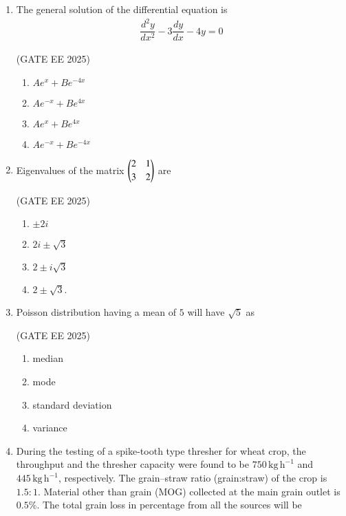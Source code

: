 \documentclass[journal,12pt,onecolumn]{IEEEtran}
\theoremstyle{remark}
\begin{document}
\begin{enumerate}
\item The general solution of the differential equation is
\begin{align*}
\dfrac{d^2 y}{dx^2} - 3\dfrac{dy}{dx} - 4y = 0
\end{align*}

\hfill(GATE EE 2025)

\begin{multicols}{4}
\begin{enumerate}
  \item  $Ae^{x} + Be^{-4x}$
  \item $Ae^{-x} + Be^{4x}$ 
  \item $Ae^{x} + Be^{4x}$ 
  \item $Ae^{-x} + Be^{-4x}$
\end{enumerate}
\end{multicols}

\item Eigenvalues of the matrix $\begin{pmatrix}2 & 1\\[2pt] 3 & 2\end{pmatrix}$ are\

\hfill(GATE EE 2025)

\begin{multicols}{4}
 \begin{enumerate}
     \item  $\pm 2i$ 
     \item  $2i\pm \sqrt{3}\,$
     \item  $2 \pm i\sqrt3$
     \item  $2 \pm \sqrt3$.
 \end{enumerate}   
\end{multicols}

\item Poisson distribution having a mean of $5$ will have $\sqrt{5}$ as\

\hfill(GATE EE 2025)

\begin{multicols}{2}
\begin{enumerate}
    \item  median 
    \item mode
    \item standard deviation
    \item variance
\end{enumerate}
\end{multicols}

\item During the testing of a spike-tooth type thresher for wheat crop, the throughput and the thresher capacity were found to be $750\,\mathrm{kg\,h^{-1}}$ and $445\,\mathrm{kg\,h^{-1}}$, respectively. The grain--straw ratio (grain:straw) of the crop is $1.5:1$. Material other than grain (MOG) collected at the main grain outlet is $0.5\%$. The total grain loss in percentage from all the sources will be\


\end{enumerate}
\end{document}
